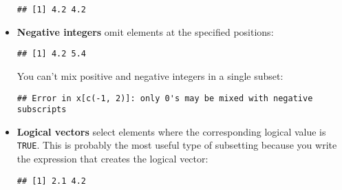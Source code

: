\begin{itemize}
\begin{verbatim}
## [1] 4.2 4.2
\end{verbatim}
\item
  \textbf{Negative integers} omit elements at the specified positions:

\begin{Shaded}
\begin{Highlighting}[]
\NormalTok{x[}\OperatorTok{-}\NormalTok{(}\NormalTok{, }\NormalTok{)]}
\end{Highlighting}
\end{Shaded}

\begin{verbatim}
## [1] 4.2 5.4
\end{verbatim}

  You can't mix positive and negative integers in a single subset:

\begin{Shaded}
\begin{Highlighting}[]
\NormalTok{x[}\NormalTok{(}\OperatorTok{-}\NormalTok{, }\NormalTok{)]}
\end{Highlighting}
\end{Shaded}

\begin{verbatim}
## Error in x[c(-1, 2)]: only 0's may be mixed with negative subscripts
\end{verbatim}
\item
  \textbf{Logical vectors} select elements where the corresponding
  logical value is \texttt{TRUE}. This is probably the most useful type
  of subsetting because you write the expression that creates the
  logical vector: 

\begin{Shaded}
\begin{Highlighting}[]
\NormalTok{x[}\NormalTok{(}\NormalTok{, }\NormalTok{, }\NormalTok{, }\NormalTok{)]}
\end{Highlighting}
\end{Shaded}

\begin{verbatim}
## [1] 2.1 4.2
\end{verbatim}

\begin{Shaded}
\begin{Highlighting}[]
\NormalTok{x[x }\OperatorTok{>}\StringTok{ }\NormalTok{]}
\end{Highlighting}
\end{Shaded}


\end{itemize}
